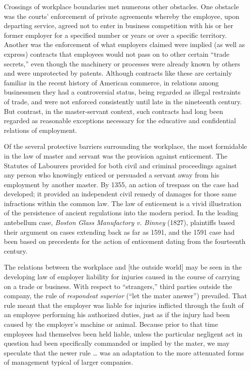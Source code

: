 \documentclass[
  letterpaper,
  11pt,
  DIV=9,
  openright]{scrbook}
\begin{document}
Crossings of workplace boundaries met numerous other obstacles. One
obstacle was the courts' enforcement of private agreements whereby the
employee, upon departing service, agreed not to enter in business
competition with his or her former employer for a specified number or
years or over a specific territory. Another was the enforcement of what
employers claimed were implied (as well as express) contracts that
employees would not pass on to other certain ``trade secrets,'' even
though the machinery or processes were already known by others and were
unprotected by patents. Although contracts like these are certainly
familiar in the recent history of American commerce, in relations among
businessmen they had a controversial status, being regarded as illegal
restraints of trade, and were not enforced consistently until late in
the nineteenth century. But contrast, in the master-servant context,
such contracts had long been regarded as reasonable exceptions necessary
for the educative and confidential relations of employment.

Of the several protective barriers surrounding the workplace, the most
formidable in the law of master and servant was the provision against
enticement. The Statutes of Labourers provided for both civil and
criminal proceedings against any person who knowingly enticed or
persuaded a servant away from his employment by another master. By 1355,
an action of trespass on the case had developed; it provided an
independent civil remedy of damages for those same infractions within
the common law. The law of enticement is a vivid illustration of the
persistence of ancient regulations into the modern period. In the
leading antebellum case, \emph{Boston Glass Manufactory v. Binney}
(1827), plaintiffs based their argument on cases extending back as far
as 1591, and the 1591 case had been based on precedents for the action
of enticement dating from the fourteenth century.

The relations between the workplace and {[}the outside world{]} may be
seen in the developing law of employer liability for injuries caused in
the course of carrying on a trade or business. With respect to
``strangers,'' third parties outside the company, the rule of
\emph{respondeat superior} (``let the mater answer'') prevailed. That
rule meant that the employer was liable for injuries inflicted through
the fault of an employee performing his authorized duties, just as if
the injury had been caused by the employer's machine or animal. Because
prior to that time employees had themselves been held liable, unless the
particular negligent act in question had been specifically commanded or
implied by the mater, we may speculate that the newer rule \ldots{} was
an adaptation to the more attenuated forms of management typical of
larger companies.
\end{document}
